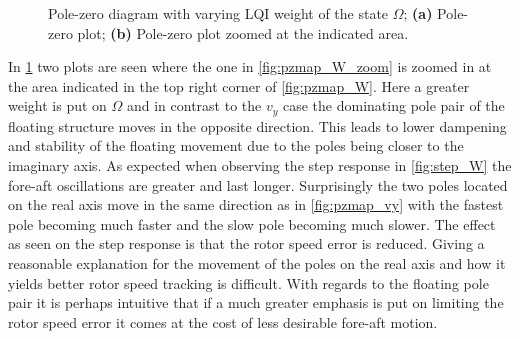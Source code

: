 \begin{figure}[ht]
	\centering
	
	\hfil
	
	\caption{Pole-zero diagram with varying LQI weight of the state $ \Omega $; \textbf{(a)} Pole-zero plot; \textbf{(b)} Pole-zero plot zoomed at the indicated area.}
	\label{fig:pzmap_W_both}
\end{figure}
In \cref{fig:pzmap_W_both} two plots are seen where the one in \cref{fig:pzmap_W_zoom} is zoomed in at the area indicated in the top right corner of \cref{fig:pzmap_W}. Here a greater weight is put on $ \Omega $ and in contrast to the $ v_y $ case the dominating pole pair of the floating structure moves in the opposite direction. This leads to lower dampening and stability of the floating movement due to the poles being closer to the imaginary axis. As expected when observing the step response in \cref{fig:step_W} the fore-aft oscillations are greater and last longer. Surprisingly the two poles located on the real axis move in the same direction as in \cref{fig:pzmap_vy} with the fastest pole becoming much faster and the slow pole becoming much slower. The effect as seen on the step response is that the rotor speed error is reduced. Giving a reasonable explanation for the movement of the poles on the real axis and how it yields better rotor speed tracking is difficult. With regards to the floating pole pair it is perhaps intuitive that if a much greater emphasis is put on limiting the rotor speed error it comes at the cost of less desirable fore-aft motion.

